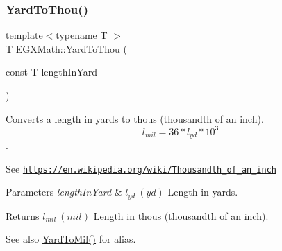 \subsubsection{\texorpdfstring{Yard\+To\+Thou()}{YardToThou()}}
{\footnotesize\ttfamily template$<$typename T $>$ \\
T E\+G\+X\+Math\+::\+Yard\+To\+Thou (\begin{DoxyParamCaption}\item[{const T}]{length\+In\+Yard }\end{DoxyParamCaption})}



Converts a length in yards to thous (thousandth of an inch). \[ l_{mil}=36 * l_{yd} * 10^{3} \]. 

See \href{https://en.wikipedia.org/wiki/Thousandth_of_an_inch}{\tt https\+://en.\+wikipedia.\+org/wiki/\+Thousandth\+\_\+of\+\_\+an\+\_\+inch} 
\begin{DoxyParams}{Parameters}
{\em length\+In\+Yard} & $ l_{yd}\ (yd)$ Length in yards. \\
\hline
\end{DoxyParams}
\begin{DoxyReturn}{Returns}
$ l_{mil}\ (mil)$ Length in thous (thousandth of an inch). 
\end{DoxyReturn}
\begin{DoxySeeAlso}{See also}
\mbox{\hyperlink{group___e_g_x_math-_conversions-_length_conversions-_imperial-_yard-_imperial_ga9ff8041d33178b44c133dbbd37a8b267}{Yard\+To\+Mil()}} for alias. 
\end{DoxySeeAlso}
